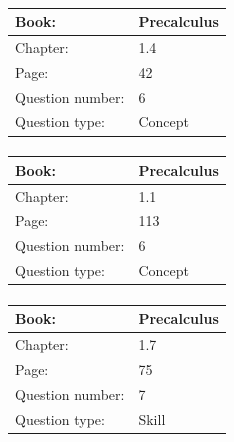 \documentclass{article}
\begin{document}
            \paragraph{}
            \begin{tabularx}{1\textwidth}{
                    p{}
                    p{}
                }
                \toprule
                Book: & Precalculus
                \\
                \midrule
                Chapter: & 1.4
                \\
                \midrule
                Page: & 42
                \\
                \midrule
                Question number: & 6
                \\
                \midrule
                Question type: & Concept
                \\
                \bottomrule
            \end{tabularx}
            
            \paragraph{}
            \begin{tabularx}{1\textwidth}{
                    p{}
                    p{}
                }
                \toprule
                Book: & Precalculus
                \\
                \midrule
                Chapter: & 1.1
                \\
                \midrule
                Page: & 113
                \\
                \midrule
                Question number: & 6
                \\
                \midrule
                Question type: & Concept
                \\
                \bottomrule
            \end{tabularx}
            
            \paragraph{}
            \begin{tabularx}{1\textwidth}{
                    p{}
                    p{}
                }
                \toprule
                Book: & Precalculus
                \\
                \midrule
                Chapter: & 1.7
                \\
                \midrule
                Page: & 75
                \\
                \midrule
                Question number: & 7
                \\
                \midrule
                Question type: & Skill
                \\
                \bottomrule
            \end{tabularx}
            
\end{document}
